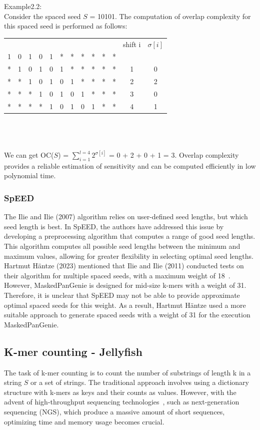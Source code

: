 \documentclass{PHlab-thesis}
\begin{document}
Example2.2:\\
Consider the spaced seed $S$ = 10101. The computation of overlap complexity for this spaced seed is performed as follows:\\  
\begin{tabular}{ccccccccccccc}
  &   &   &   &   &   &   &   &   &   &   & shift i & $\sigma[i]$ \\
1 & 0 & 1 & 0 & 1 & * & * & * & * & * & * &         &            \\
* & 1 & 0 & 1 & 0 & 1 & * & * & * & * & * &   1     &     0      \\
* & * & 1 & 0 & 1 & 0 & 1 & * & * & * & * &   2     &     2       \\
* & * & * & 1 & 0 & 1 & 0 & 1 & * & * & * &   3     &     0        \\
* & * & * & * & 1 & 0 & 1 & 0 & 1 & * & * &   4     &     1        \\
\end{tabular}\\\\\\
We can get OC($S$) = $\sum\limits_{i = 1}^{l = 4}2^{\sigma[i]}$ = 0 + 2 + 0 + 1 = 3. Overlap complexity provides a reliable estimation of sensitivity and can be computed efficiently in low polynomial time. 
\subsubsection{SpEED}
The Ilie and Ilie (2007) algorithm relies on user-defined seed lengths, but which seed length is best. In SpEED, the authors have addressed this issue by developing a preprocessing algorithm that computes a range of good seed lengths. This algorithm computes all possible seed lengths between the minimum and maximum values, allowing for greater flexibility in selecting optimal seed lengths. Hartmut Häntze (2023) mentioned that Ilie and Ilie (2011) conducted tests on their algorithm for multiple spaced seeds, with a maximum weight of 18~\cite{haimo2023MaskedPanGenie}. However, MaskedPanGenie is designed for mid-size k-mers with a weight of 31. Therefore, it is unclear that SpEED may not be able to provide approximate optimal spaced seeds for this weight. As a result,  Hartmut Häntze used a more suitable approach to generate spaced seeds with a weight of 31 for the execution MaskedPanGenie.
\subsection{K-mer counting - Jellyfish}
The task of k-mer counting is to count the number of substrings of length k in a string $S$ or a set of strings. The traditional approach involves using a dictionary structure with k-mers as keys and their counts as values. However, with the advent of high-throughput sequencing technologies~\cite{Reu2015Sequencing}, such as next-generation sequencing (NGS), which produce a massive amount of short sequences, optimizing time and memory usage becomes crucial.
\end{document}
